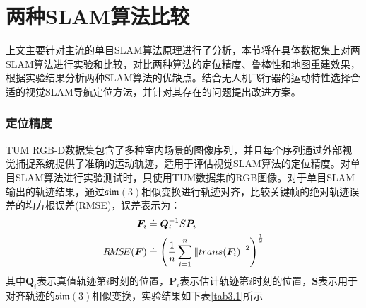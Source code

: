 \section{两种SLAM算法比较}
上文主要针对主流的单目SLAM算法原理进行了分析，本节将在具体数据集上对两SLAM算法进行实验和比较，对比两种算法的定位精度、鲁棒性和地图重建效果，根据实验结果分析两种SLAM算法的优缺点。结合无人机飞行器的运动特性选择合适的视觉SLAM导航定位方法，并针对其存在的问题提出改进方案。

\subsubsection*{定位精度}
TUM RGB-D数据集\upcite{[3.12]}包含了多种室内场景的图像序列，并且每个序列通过外部视觉捕捉系统提供了准确的运动轨迹，适用于评估视觉SLAM算法的定位精度。对单目SLAM算法进行实验测试时，只使用TUM数据集的RGB图像。对于单目SLAM输出的轨迹结果，通过$\mathfrak{sim}(3)$相似变换进行轨迹对齐，比较关键帧的绝对轨迹误差的均方根误差(RMSE)，误差表示为：
\begin{equation}
\label{equ3.23}
\begin{aligned}
\boldsymbol{F}_i &\doteq \boldsymbol{Q}_i^{-1} S \boldsymbol{P}_i
\\ 
R\!M\!S\!E(\boldsymbol{F}) &\doteq \left( {1 \over n} \sum\limits_{i=1}^n \left \Vert trans(\boldsymbol{F}_i) \right \Vert^2 \right)^{1 \over 2} 
\end{aligned}
\end{equation}
其中$\boldsymbol{Q}_i$表示真值轨迹第$i$时刻的位置，$\boldsymbol{P}_i$表示估计轨迹第$i$时刻的位置，$\boldsymbol{S}$表示用于对齐轨迹的$\mathfrak{sim}(3)$相似变换，实验结果如下表\ref{tab3.1}所示

